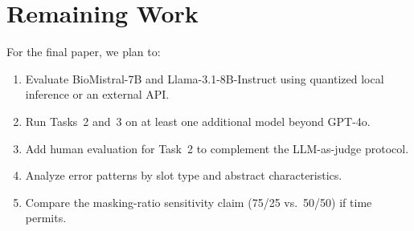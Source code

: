 \documentclass[11pt]{article}
\begin{document}
\section{Remaining Work}

For the final paper, we plan to:
\begin{enumerate}
  \item Evaluate BioMistral-7B and Llama-3.1-8B-Instruct using quantized local inference or an external API.
  \item Run Tasks~2 and~3 on at least one additional model beyond GPT-4o.
  \item Add human evaluation for Task~2 to complement the LLM-as-judge protocol.
  \item Analyze error patterns by slot type and abstract characteristics.
  \item Compare the masking-ratio sensitivity claim (75/25 vs.\ 50/50) if time permits.
\end{enumerate}



\end{document}
